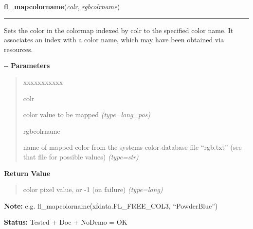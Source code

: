     \label{xformslib:flbasic:fl_mapcolorname}

    \vspace{0.5ex}

\hspace{.8\funcindent}\begin{boxedminipage}{\funcwidth}

    \raggedright \textbf{fl\_mapcolorname}(\textit{colr}, \textit{rgbcolrname})

    \vspace{-1.5ex}

    \rule{\textwidth}{0.5\fboxrule}
\setlength{\parskip}{2ex}

Sets the color in the colormap indexed by colr to the specified color
name. It associates an index with a color name, which may have been
obtained via resources.

-{}-
\setlength{\parskip}{1ex}
      \textbf{Parameters}
      \vspace{-1ex}

      \begin{quote}
        \begin{Ventry}{xxxxxxxxxxx}

          \item[colr]


color value to be mapped
            {\it (type=long\_pos)}

          \item[rgbcolrname]


name of mapped color from the systems color database file ``rgb.txt''
(see that file for possible values)
            {\it (type=str)}

        \end{Ventry}

      \end{quote}

      \textbf{Return Value}
    \vspace{-1ex}

      \begin{quote}

color pixel value, or -1 (on failure)
      {\it (type=long)}

      \end{quote}

\textbf{Note:} 
e.g. fl\_mapcolorname(xfdata.FL\_FREE\_COL3, ``PowderBlue'')


\textbf{Status:} 
Tested + Doc + NoDemo = OK


    \end{boxedminipage}

